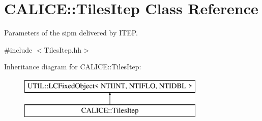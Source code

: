 \section{C\-A\-L\-I\-C\-E\-:\-:Tiles\-Itep Class Reference}
\label{classCALICE_1_1TilesItep}


Parameters of the sipm delivered by I\-T\-E\-P.  




{\ttfamily \#include $<$Tiles\-Itep.\-hh$>$}

Inheritance diagram for C\-A\-L\-I\-C\-E\-:\-:Tiles\-Itep\-:\begin{figure}[H]
\begin{center}
\leavevmode
\includegraphics[height=2.000000cm]{classCALICE_1_1TilesItep}
\end{center}
\end{figure}
